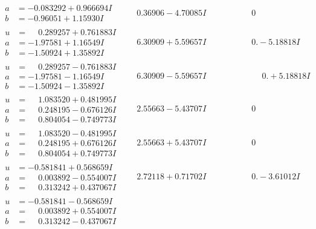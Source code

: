 \documentclass[1p]{elsarticle_modified}
\theoremstyle{definition}
\begin{document}
$$\begin{array}{c|c|c}
\begin{aligned}
a &= -0.083292 + 0.966694 I \\
b &= -0.96051 + 1.15930 I\end{aligned}
 & \phantom{-}0.36906 - 4.70085 I & \phantom{-0.000000 } 0 \\ \hline\begin{aligned}
u &= \phantom{-}0.289257 + 0.761883 I \\
a &= -1.97581 + 1.16549 I \\
b &= -1.50924 + 1.35892 I\end{aligned}
 & \phantom{-}6.30909 + 5.59657 I & \phantom{-0.000000 } 0. - 5.18818 I \\ \hline\begin{aligned}
u &= \phantom{-}0.289257 - 0.761883 I \\
a &= -1.97581 - 1.16549 I \\
b &= -1.50924 - 1.35892 I\end{aligned}
 & \phantom{-}6.30909 - 5.59657 I & \phantom{-0.000000 -}0. + 5.18818 I \\ \hline\begin{aligned}
u &= \phantom{-}1.083520 + 0.481995 I \\
a &= \phantom{-}0.248195 - 0.676126 I \\
b &= \phantom{-}0.804054 - 0.749773 I\end{aligned}
 & \phantom{-}2.55663 - 5.43707 I & \phantom{-0.000000 } 0 \\ \hline\begin{aligned}
u &= \phantom{-}1.083520 - 0.481995 I \\
a &= \phantom{-}0.248195 + 0.676126 I \\
b &= \phantom{-}0.804054 + 0.749773 I\end{aligned}
 & \phantom{-}2.55663 + 5.43707 I & \phantom{-0.000000 } 0 \\ \hline\begin{aligned}
u &= -0.581841 + 0.568659 I \\
a &= \phantom{-}0.003892 - 0.554007 I \\
b &= \phantom{-}0.313242 + 0.437067 I\end{aligned}
 & \phantom{-}2.72118 + 0.71702 I & \phantom{-0.000000 } 0. - 3.61012 I \\ \hline\begin{aligned}
u &= -0.581841 - 0.568659 I \\
a &= \phantom{-}0.003892 + 0.554007 I \\
b &= \phantom{-}0.313242 - 0.437067 I\end{aligned}

\end{array}$$
\end{document}
